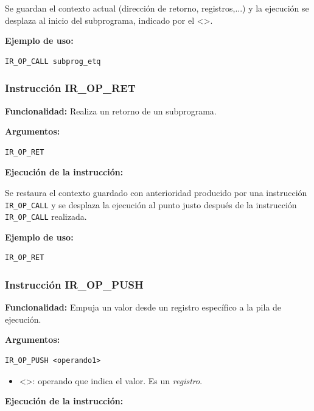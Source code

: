 \noindent
Se guardan el contexto actual (dirección de retorno, registros,...) y la ejecución se desplaza al inicio del subprograma, indicado por el <>.
\vspace{0.3cm}

\noindent
\textbf{Ejemplo de uso:}
\begin{verbatim}
IR_OP_CALL subprog_etq
\end{verbatim}

\subsubsection{Instrucción IR\_OP\_RET}\label{subsubsec:IR_OP_RET}
\noindent
\textbf{Funcionalidad:} Realiza un retorno de un subprograma.

\noindent
\textbf{Argumentos:}
\begin{verbatim}
IR_OP_RET
\end{verbatim}

\noindent
\textbf{Ejecución de la instrucción:}
\vspace{0.3cm}

\noindent
Se restaura el contexto guardado con anterioridad producido por una instrucción \texttt{IR\_OP\_CALL} y se desplaza la ejecución al punto justo después de la instrucción \texttt{IR\_OP\_CALL} realizada.
\vspace{0.3cm}

\noindent
\textbf{Ejemplo de uso:}
\begin{verbatim}
IR_OP_RET
\end{verbatim}


\subsubsection{Instrucción IR\_OP\_PUSH}\label{subsubsec:IR_OP_PUSH}
\noindent
\textbf{Funcionalidad:} Empuja un valor desde un registro específico a la pila de ejecución.

\noindent
\textbf{Argumentos:}
\begin{verbatim}
IR_OP_PUSH <operando1>
\end{verbatim}
\begin{itemize}
    \item <>: operando que indica el valor. Es un \textit{registro}.
\end{itemize}

\noindent
\textbf{Ejecución de la instrucción:}
\vspace{0.3cm}


